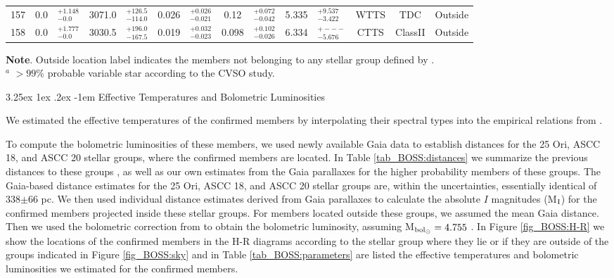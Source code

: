 \documentclass[12pt]{article}
\makeatletter
\renewcommand\paragraph{\@startsection{paragraph}{5}{\z@}%
  {3.25ex \@plus1ex \@minus.2ex}%
  {-1em}%
  {\normalfont\normalsize\bfseries}}
\makeatother
\begin{document}
\begin{table}
\begin{threeparttable}
\begin{tabular}{lclclclclclccc}
 	157         & 0.0   & $^{+1.148}_{-0.0  }$ & 3071.0 & $^{+126.5 }_{-114.0}$ & 0.026 & $^{+0.026 }_{-0.021}$ & 0.12  & $^{+0.072 }_{-0.042}$ & 5.335  & $^{+9.537  }_{-3.422}$  & WTTS & TDC      & Outside       \\
 	158         & 0.0   & $^{+1.777}_{-0.0  }$ & 3030.5 & $^{+196.0 }_{-167.5}$ & 0.019 & $^{+0.032 }_{-0.023}$ & 0.098 & $^{+0.102 }_{-0.026}$ & 6.334  & $^{+---    }_{-5.676}$  & CTTS & ClassII  & Outside       \\
	\bottomrule
	\end{tabular}
	\begin{tablenotes}
	  {\bf Note}. Outside location label indicates the members not belonging to any stellar group defined by \citet{Kharchenko2013}.\\
      $^a$ $>99\%$ probable variable star according to the CVSO study.\\
	\end{tablenotes}
 \end{threeparttable}
\end{table}

\paragraph{Effective Temperatures and Bolometric Luminosities\\}
\label{sec_BOSS:HR}

We estimated the effective temperatures of the confirmed members by interpolating their spectral types into the empirical relations from \citet{Luhman1999}.

To compute the bolometric luminosities of these members, we used newly available Gaia data \citep[DR1; ][]{GaiaCollaboration2016} to establish distances for the 25 Ori, ASCC 18, and ASCC 20 stellar groups, where the confirmed members are located. In Table \ref{tab_BOSS:distances} we summarize the previous distances to these groups \citep{Kharchenko2005,Briceno2005,Briceno2007,Kharchenko2013,Downes2014}, as well as our own estimates from the Gaia parallaxes for the higher probability \citet{Kharchenko2005} members of these groups. The Gaia-based distance estimates for the 25 Ori, ASCC 18, and ASCC 20 stellar groups are, within the uncertainties, essentially identical of 338$\pm$66 pc. We then used individual distance estimates derived from Gaia parallaxes to calculate the absolute $I$ magnitudes (M$_\textrm{\scriptsize {I}}$) for the confirmed members projected inside these stellar groups. For members located outside these groups, we assumed the mean Gaia distance. Then we used the bolometric correction from \citet{Kenyon-Hartmann1995} to obtain the bolometric luminosity, assuming M$_{\textrm{\scriptsize{bol}}_\odot}=4.755$ \citep{Mamajek2012}. In Figure \ref{fig_BOSS:H-R} we show the locations of the confirmed members in the H-R diagrams according to the stellar group where they lie or if they are outside of the groups indicated in Figure \ref{fig_BOSS:sky} and in Table \ref{tab_BOSS:parameters} are listed the effective temperatures and bolometric luminosities we estimated for the confirmed members.
\end{document}
